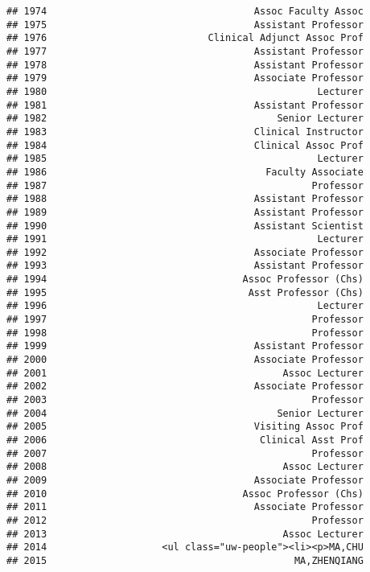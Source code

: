\documentclass[
]{article}
\begin{document}
\begin{verbatim}
## 1974                                    Assoc Faculty Assoc
## 1975                                    Assistant Professor
## 1976                            Clinical Adjunct Assoc Prof
## 1977                                    Assistant Professor
## 1978                                    Assistant Professor
## 1979                                    Associate Professor
## 1980                                               Lecturer
## 1981                                    Assistant Professor
## 1982                                        Senior Lecturer
## 1983                                    Clinical Instructor
## 1984                                    Clinical Assoc Prof
## 1985                                               Lecturer
## 1986                                      Faculty Associate
## 1987                                              Professor
## 1988                                    Assistant Professor
## 1989                                    Assistant Professor
## 1990                                    Assistant Scientist
## 1991                                               Lecturer
## 1992                                    Associate Professor
## 1993                                    Assistant Professor
## 1994                                  Assoc Professor (Chs)
## 1995                                   Asst Professor (Chs)
## 1996                                               Lecturer
## 1997                                              Professor
## 1998                                              Professor
## 1999                                    Assistant Professor
## 2000                                    Associate Professor
## 2001                                         Assoc Lecturer
## 2002                                    Associate Professor
## 2003                                              Professor
## 2004                                        Senior Lecturer
## 2005                                    Visiting Assoc Prof
## 2006                                     Clinical Asst Prof
## 2007                                              Professor
## 2008                                         Assoc Lecturer
## 2009                                    Associate Professor
## 2010                                  Assoc Professor (Chs)
## 2011                                    Associate Professor
## 2012                                              Professor
## 2013                                         Assoc Lecturer
## 2014                    <ul class="uw-people"><li><p>MA,CHU
## 2015                                           MA,ZHENQIANG

\end{verbatim}
\end{document}
